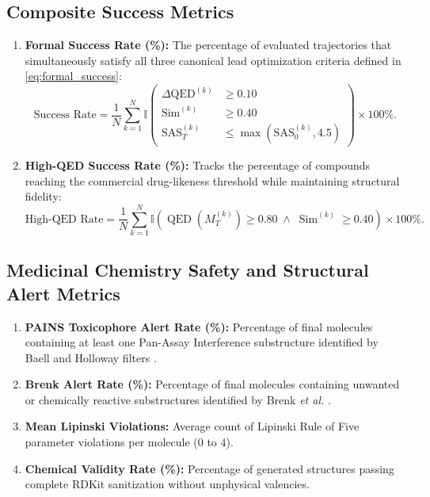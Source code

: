 \documentclass{ieeeaccess}
\begin{document}
\subsection{Composite Success Metrics}
\begin{enumerate}
    \item \textbf{Formal Success Rate (\%):} The percentage of evaluated trajectories that simultaneously satisfy all three canonical lead optimization criteria defined in \eqref{eq:formal_success}:
    \begin{equation}
    \text{Success Rate} = \frac{1}{N} \sum_{k=1}^N \mathbb{I}\left( \begin{aligned}
    \Delta\text{QED}^{(k)} &\ge 0.10 \\
    \text{Sim}^{(k)} &\ge 0.40 \\
    \text{SAS}_T^{(k)} &\le \max(\text{SAS}_0^{(k)}, 4.5)
    \end{aligned} \right) \times 100\%.
    \label{eq:formal_success_rate}
    \end{equation}
    \item \textbf{High-QED Success Rate (\%):} Tracks the percentage of compounds reaching the commercial drug-likeness threshold while maintaining structural fidelity:
    \begin{equation}
    \text{High-QED Rate} = \frac{1}{N} \sum_{k=1}^N \mathbb{I}\left( \operatorname{QED}(M_T^{(k)}) \ge 0.80 \;\land\; \operatorname{Sim}^{(k)} \ge 0.40 \right) \times 100\%.
    \label{eq:high_qed_rate}
    \end{equation}
\end{enumerate}

\subsection{Medicinal Chemistry Safety and Structural Alert Metrics}
\begin{enumerate}
    \item \textbf{PAINS Toxicophore Alert Rate (\%):} Percentage of final molecules containing at least one Pan-Assay Interference substructure identified by Baell and Holloway filters \cite{baell2010}.
    \item \textbf{Brenk Alert Rate (\%):} Percentage of final molecules containing unwanted or chemically reactive substructures identified by Brenk \emph{et al.} \cite{brenk2008}.
    \item \textbf{Mean Lipinski Violations:} Average count of Lipinski Rule of Five parameter violations per molecule ($0$ to $4$).
    \item \textbf{Chemical Validity Rate (\%):} Percentage of generated structures passing complete RDKit sanitization without unphysical valencies.
\end{enumerate}
\end{document}
